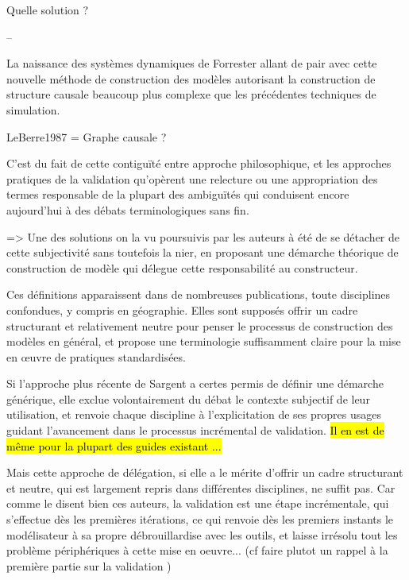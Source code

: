 Quelle solution ? 




--


La naissance des systèmes dynamiques de Forrester allant de pair avec cette nouvelle méthode de construction des modèles autorisant la construction de structure causale beaucoup plus complexe que les précédentes techniques de simulation. 

LeBerre1987 = Graphe causale ? 





C'est du fait de cette contiguïté entre approche philosophique, et les approches pratiques de la validation qu'opèrent une relecture ou une appropriation des termes responsable de la plupart des ambiguïtés qui conduisent encore aujourd'hui à des débats terminologiques sans fin. \autocite{David2009}

=> Une des solutions on la vu poursuivis par les auteurs à été de se détacher de cette subjectivité sans toutefois la nier, en proposant une démarche théorique de construction de modèle qui délegue cette responsabilité au constructeur.

Ces définitions apparaissent dans de nombreuses publications, toute disciplines confondues, y compris en géographie. Elles sont supposés offrir un cadre structurant et relativement neutre pour penser le processus de construction des modèles en général, et propose une terminologie suffisamment claire pour la mise en œuvre de pratiques standardisées. 

Si l'approche plus récente de Sargent a certes permis de définir une démarche générique, elle exclue volontairement du débat le contexte subjectif de leur utilisation, et renvoie chaque discipline à l'explicitation de ses propres usages guidant l'avancement dans le processus incrémental de validation. \hl{Il en est de même pour la plupart des guides existant ...}

Mais cette approche de délégation, si elle a le mérite d'offrir un cadre structurant et neutre, qui est largement repris dans différentes disciplines, ne suffit pas. Car comme le disent bien ces auteurs, la validation est une étape incrémentale, qui s'effectue dès les premières itérations, ce qui renvoie dès les premiers instants le modélisateur à sa propre débrouillardise avec les outils, et laisse irrésolu tout les problème périphériques à cette mise en oeuvre... (cf faire plutot un rappel à la première partie sur la validation ) 


